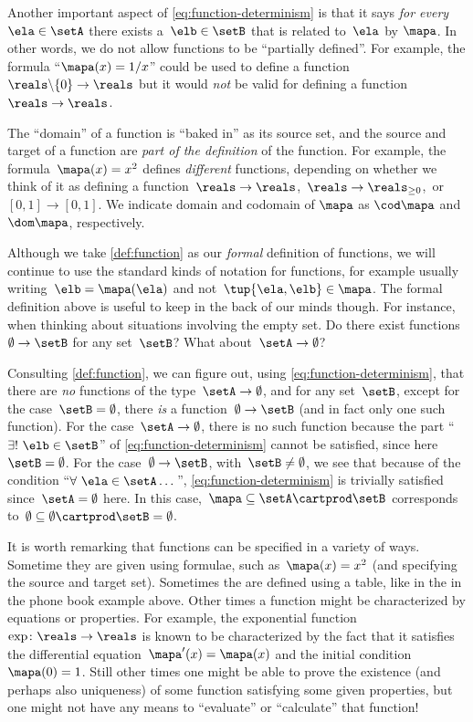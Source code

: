 Another important aspect of \cref{eq:function-determinism} is that it says \emph{for every}~$\ela \in \setA$ there exists a~$\elb \in \setB$ that is related to~$\ela$ by $\mapa$.
In other words, we do not allow functions to be ``partially defined''.
For example, the formula ``$\mapa(x) = 1/x$'' could be used to define a function~$\reals \backslash \{ 0 \} \to \reals$ but it would \emph{not} be valid for defining a function~$\reals \to \reals$.

\label{sec:domain-codomain}
The ``domain'' of a function is ``baked in'' as its source set, and the source and target of a function are \emph{part of the definition} of the function.
For example, the formula~$\mapa(x) = x^2$ defines \emph{different} functions, depending on whether we think of it as defining a function~$\reals \to \reals$,~$\reals \to \reals_{\geq 0}$,~or $[0,1] \to [0,1]$.
We indicate domain and codomain of $\mapa$ as $\cod\mapa$ and $\dom\mapa$, respectively.


Although we take \cref{def:function} as our \emph{formal} definition of functions, we will continue to use the standard kinds of notation for functions, for example usually writing~$\elb = \mapa(\ela)$ and not~$\tup{\ela, \elb} \in \mapa$.
The formal definition above is useful to keep in the back of our minds though.
For instance, when thinking about situations involving the empty set.
Do there exist functions~$\emptyset \to \setB$ for any set~$\setB$? What about~$\setA \to \emptyset$?

Consulting \cref{def:function}, we can figure out, using \cref{eq:function-determinism}, that there are \emph{no} functions of the type~$\setA \to \emptyset$, and for any set~$\setB$, except for the case~$\setB = \emptyset$, there \emph{is} a function~$\emptyset \to \setB$ (and in fact only one such function).
For the case~$\setA \to \emptyset$, there is no such function because the part ``$\exists ! \ \elb \in \setB$'' of \cref{eq:function-determinism} cannot be satisfied, since here~$\setB = \emptyset$.
For the case~$\emptyset \to \setB$, with~$\setB \neq \emptyset$, we see that because of the condition ``$\forall \ \ela \in \setA \dots$'', \cref{eq:function-determinism} is trivially satisfied since~$\setA = \emptyset$ here.
In this case,~$\mapa \subseteq \setA \cartprod \setB$ corresponds to~$\emptyset \subseteq \emptyset \cartprod \setB = \emptyset$.

It is worth remarking that functions can be specified in a variety of ways.
Sometime they are given using formulae, such as~$\mapa(x)=x^2$ (and specifying the source and target set).
Sometimes the are defined using a table, like in the in the phone book example above.
Other times a function might be characterized by equations or properties.
For example, the exponential function~$\exp \colon \reals \to \reals$ is known to be characterized by the fact that it satisfies the differential equation~$\mapa'(x) = \mapa(x)$ and the initial condition~$\mapa(0) =1$.
Still other times one might be able to prove the existence (and perhaps also uniqueness) of some function satisfying some given properties, but one might not have any means to ``evaluate'' or ``calculate'' that function!

